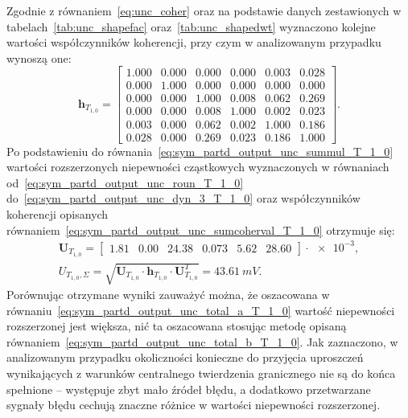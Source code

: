 Zgodnie z równaniem~\eqref{eq:unc_coher} oraz na podstawie danych zestawionych w tabelach~\ref{tab:unc_shapefac} oraz~\ref{tab:unc_shapedwt} wyznaczono kolejne wartości współczynników koherencji, przy czym w analizowanym przypadku wynoszą one:
\begin{equation}
\mathbf{h}_{T_{1,0}} =
\begin{bmatrix}
1.000 & 0.000 & 0.000 & 0.000 & 0.003 & 0.028 \\
0.000 & 1.000 & 0.000 & 0.000 & 0.000 & 0.000 \\
0.000 & 0.000 & 1.000 & 0.008 & 0.062 & 0.269 \\
0.000 & 0.000 & 0.008 & 1.000 & 0.002 & 0.023 \\
0.003 & 0.000 & 0.062 & 0.002 & 1.000 & 0.186 \\
0.028 & 0.000 & 0.269 & 0.023 & 0.186 & 1.000
\end{bmatrix}
\label{eq:sym_partd_output_unc_sumcoherval_T_1_0}.
\end{equation}
Po podstawieniu do równania~\eqref{eq:sym_partd_output_unc_summul_T_1_0} wartości rozszerzonych niepewności cząstkowych wyznaczonych w równaniach od~\eqref{eq:sym_partd_output_unc_roun_T_1_0} do~\eqref{eq:sym_partd_output_unc_dyn_3_T_1_0} oraz współczynników koherencji opisanych równaniem~\eqref{eq:sym_partd_output_unc_sumcoherval_T_1_0} otrzymuje się:
\begin{gather}
\mathbf{U}_{T_{1,0}} =
\begin{bmatrix}
\num{1.81} & \num{0.00} & \num{24.38} & \num{0.073} & \num{5.62} & \num{28.60}
\end{bmatrix} \cdot \num{e-3}
\label{eq:sym_partd_output_unc_sumuvectval_T_1_0}, \\
U_{T_{1,0},\Sigma} = \sqrt{\mathbf{U}_{T_{1,0}} \cdot \mathbf{h}_{T_{1,0}} \cdot \mathbf{U}_{T_{1,0}}^{T}} = \qty{43.61}{mV} \label{eq:sym_partd_output_unc_total_b_T_1_0}.
\end{gather}
Porównując otrzymane wyniki zauważyć można, że oszacowana w równaniu~\eqref{eq:sym_partd_output_unc_total_a_T_1_0} wartość niepewności rozszerzonej jest większa, nić ta oszacowana stosując metodę opisaną równaniem~\eqref{eq:sym_partd_output_unc_total_b_T_1_0}. Jak zaznaczono, w analizowanym przypadku okoliczności konieczne do przyjęcia uproszczeń wynikających z warunków centralnego twierdzenia granicznego nie są do końca spełnione -- występuje zbyt mało źródeł błędu, a dodatkowo przetwarzane sygnały błędu cechują znaczne różnice w wartości niepewności rozszerzonej.

